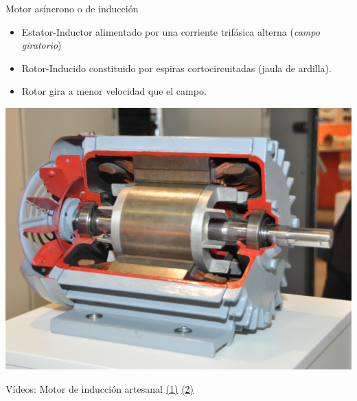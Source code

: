 \documentclass[xcolor={usenames,svgnames,dvipsnames}]{beamer}
\begin{document}
\begin{frame}[label={sec:org354c692}]{Motor asíncrono o de inducción}
\begin{itemize}
\item \alert{Estator-Inductor} alimentado por una \alert{corriente trifásica alterna} (\emph{campo giratorio})

\item \alert{Rotor-Inducido} constituido por espiras cortocircuitadas (\alert{jaula de ardilla}).

\item Rotor gira a menor velocidad que el campo.
\end{itemize}

\begin{center}
\includegraphics[height=0.5\textheight]{../figs/Seccion_Motor.jpeg}
\end{center}

Vídeos: Motor de inducción artesanal \href{http://www.youtube.com/watch?v=ZRGlAu0uCHY\&feature=related}{(1)} \href{http://www.youtube.com/watch?v=P-eTLmJC2cQ}{(2)}
\end{frame}
\end{document}
